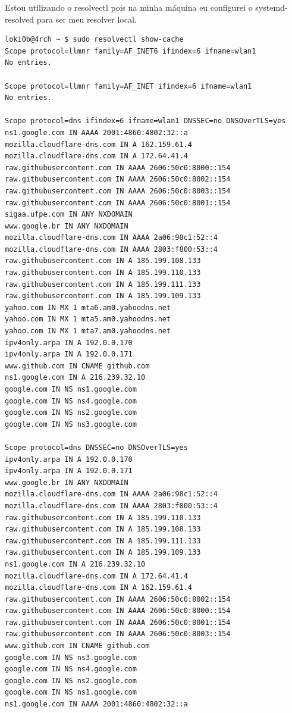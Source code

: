 
\begin{solution}
Estou utilizando o resolvectl pois na minha máquina eu configurei o systemd-resolved para ser meu resolver local.

\begin{verbatim}
loki0b@4rch ~ $ sudo resolvectl show-cache
Scope protocol=llmnr family=AF_INET6 ifindex=6 ifname=wlan1
No entries.

Scope protocol=llmnr family=AF_INET ifindex=6 ifname=wlan1
No entries.

Scope protocol=dns ifindex=6 ifname=wlan1 DNSSEC=no DNSOverTLS=yes
ns1.google.com IN AAAA 2001:4860:4802:32::a
mozilla.cloudflare-dns.com IN A 162.159.61.4
mozilla.cloudflare-dns.com IN A 172.64.41.4
raw.githubusercontent.com IN AAAA 2606:50c0:8000::154
raw.githubusercontent.com IN AAAA 2606:50c0:8002::154
raw.githubusercontent.com IN AAAA 2606:50c0:8003::154
raw.githubusercontent.com IN AAAA 2606:50c0:8001::154
sigaa.ufpe.com IN ANY NXDOMAIN
www.google.br IN ANY NXDOMAIN
mozilla.cloudflare-dns.com IN AAAA 2a06:98c1:52::4
mozilla.cloudflare-dns.com IN AAAA 2803:f800:53::4
raw.githubusercontent.com IN A 185.199.108.133
raw.githubusercontent.com IN A 185.199.110.133
raw.githubusercontent.com IN A 185.199.111.133
raw.githubusercontent.com IN A 185.199.109.133
yahoo.com IN MX 1 mta6.am0.yahoodns.net
yahoo.com IN MX 1 mta5.am0.yahoodns.net
yahoo.com IN MX 1 mta7.am0.yahoodns.net
ipv4only.arpa IN A 192.0.0.170
ipv4only.arpa IN A 192.0.0.171
www.github.com IN CNAME github.com
ns1.google.com IN A 216.239.32.10
google.com IN NS ns1.google.com
google.com IN NS ns4.google.com
google.com IN NS ns2.google.com
google.com IN NS ns3.google.com

Scope protocol=dns DNSSEC=no DNSOverTLS=yes
ipv4only.arpa IN A 192.0.0.170
ipv4only.arpa IN A 192.0.0.171
www.google.br IN ANY NXDOMAIN
mozilla.cloudflare-dns.com IN AAAA 2a06:98c1:52::4
mozilla.cloudflare-dns.com IN AAAA 2803:f800:53::4
raw.githubusercontent.com IN A 185.199.110.133
raw.githubusercontent.com IN A 185.199.108.133
raw.githubusercontent.com IN A 185.199.111.133
raw.githubusercontent.com IN A 185.199.109.133
ns1.google.com IN A 216.239.32.10
mozilla.cloudflare-dns.com IN A 172.64.41.4
mozilla.cloudflare-dns.com IN A 162.159.61.4
raw.githubusercontent.com IN AAAA 2606:50c0:8002::154
raw.githubusercontent.com IN AAAA 2606:50c0:8000::154
raw.githubusercontent.com IN AAAA 2606:50c0:8001::154
raw.githubusercontent.com IN AAAA 2606:50c0:8003::154
www.github.com IN CNAME github.com
google.com IN NS ns3.google.com
google.com IN NS ns4.google.com
google.com IN NS ns2.google.com
google.com IN NS ns1.google.com
ns1.google.com IN AAAA 2001:4860:4802:32::a
\end{verbatim}    

\end{solution}